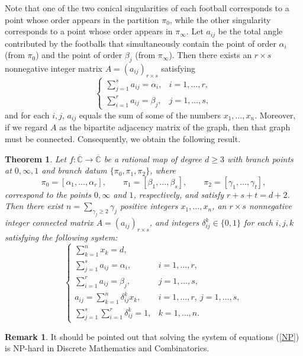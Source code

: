 \documentclass[microtype]{gtpart}     %
\newtheorem{thm}{Theorem}[section]    %
\theoremstyle{definition}
\newtheorem*{rem}{Remark}             %
\begin{document}
Note that one of the two conical singularities of each football corresponds to a point whose order appears in the partition $\pi_0$, while the other singularity corresponds to a point whose order appears in $\pi_\infty$. Let $a_{ij}$ be the total angle contributed by the footballs that simultaneously contain the point of order $\alpha_i$ (from $\pi_0$) and the point of order $\beta_j$ (from $\pi_\infty$). Then there exists an $r\times s$ nonnegative integer matrix $A=(a_{ij})_{r\times s}$ satisfying
\[
\begin{cases}
\sum\limits_{j=1}^{s} a_{ij} = \alpha_i, & i=1,\ldots,r,\\[6pt]
\sum\limits_{i=1}^{r} a_{ij} = \beta_j, & j=1,\ldots,s,
\end{cases}
\]
and for each $i,j$, $a_{ij}$ equals the sum of some of the numbers $x_1,\dots,x_n$. Moreover, if we regard $A$ as the bipartite adjacency matrix of the graph, then that graph must be connected. Consequently, we obtain the following result.

\begin{thm}\cite{Wei26}\label{Belyi}
Let $f: \overline{\mathbb{C}} \to \overline{\mathbb{C}}$ be a rational map of degree $d\geq3$ with branch points at $0,\infty,1$ and branch datum $\{\pi_0, \pi_1, \pi_2\}$, where
\[
\pi_0 = [\alpha_1, \ldots, \alpha_r],\qquad
\pi_1 = [\beta_1, \ldots, \beta_s],\qquad
\pi_2 = [\gamma_1, \ldots, \gamma_t],
\]
correspond to the points $0,\infty$ and $1$, respectively, and satisfy $r+s+t=d+2$. Then there exist $n=\sum_{\gamma_j\ge 2}\gamma_j$ positive integers $x_1,\ldots,x_n$, an $r\times s$ nonnegative integer connected matrix $A=(a_{ij})_{r\times s}$, and integers $\delta_{ij}^k\in\{0,1\}$ for each $i,j,k$ satisfying the following system:
\begin{equation}\label{NP}
\begin{cases}
\sum\limits_{k=1}^{n} x_k = d,\\[8pt]
\sum\limits_{j=1}^{s} a_{ij} = \alpha_i, & i=1,\ldots,r,\\[6pt]
\sum\limits_{i=1}^{r} a_{ij} = \beta_j, & j=1,\ldots,s,\\[6pt]
a_{ij} = \sum\limits_{k=1}^{n} \delta_{ij}^k x_k, & i=1,\ldots,r,\ j=1,\ldots,s,\\[6pt]
\sum\limits_{j=1}^{s}\sum\limits_{i=1}^{r} \delta_{ij}^k = 1, & k=1,\ldots,n.
\end{cases}
\end{equation}
\end{thm}


\begin{rem}
 It should be pointed out that solving the system of equations (\ref{NP}) is NP-hard in Discrete Mathematics and Combinatorics.
\end{rem}
\end{document}
